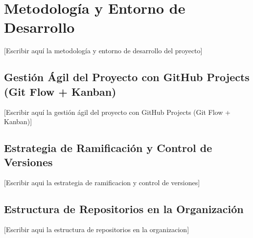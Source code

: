 
\section{Metodología y Entorno de Desarrollo}

[Escribir aquí la metodología y entorno de desarrollo del proyecto]


\subsection{Gestión Ágil del Proyecto con GitHub Projects (Git Flow + Kanban)}

[Escribir aquí la gestión ágil del proyecto con GitHub Projects (Git Flow + Kanban)]


\subsection{Estrategia de Ramificación y Control de Versiones}

[Escribir aqui la estrategia de ramificacion y control de versiones]


\subsection{Estructura de Repositorios en la Organización}

[Escribir aqui la estructura de repositorios en la organizacion]
